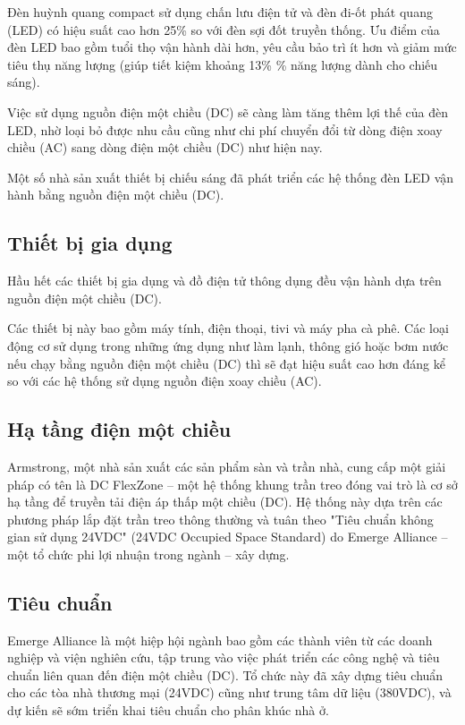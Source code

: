 \documentclass{thesis}
\begin{document}
Đèn huỳnh quang compact sử dụng chấn lưu điện tử và đèn đi-ốt phát
quang (LED) có hiệu suất cao hơn 25\% so với đèn sợi đốt truyền thống.
Ưu điểm của đèn LED bao gồm tuổi thọ vận hành dài hơn, yêu cầu bảo
trì ít hơn và giảm mức tiêu thụ năng lượng (giúp tiết kiệm khoảng 13\%
\% năng lượng dành cho chiếu sáng).

Việc sử dụng nguồn điện một chiều (DC) sẽ càng làm tăng thêm lợi
thế của đèn LED, nhờ loại bỏ được nhu cầu cũng như chi phí chuyển
đổi từ dòng điện xoay chiều (AC) sang dòng điện một chiều (DC) như hiện nay.

Một số nhà sản xuất thiết bị chiếu sáng đã phát triển các hệ thống
đèn LED vận hành bằng nguồn điện một chiều (DC).

\subsection{Thiết bị gia dụng}

Hầu hết các thiết bị gia dụng và đồ điện tử thông dụng đều vận hành
dựa trên nguồn điện một chiều (DC).

Các thiết bị này bao gồm máy tính, điện thoại, tivi và máy pha cà
phê. Các loại động cơ sử dụng trong những ứng dụng như làm lạnh,
thông gió hoặc bơm nước nếu chạy bằng nguồn điện một chiều (DC) thì
sẽ đạt hiệu suất cao hơn đáng kể so với các hệ thống sử dụng nguồn
điện xoay chiều (AC).

\subsection{Hạ tầng điện một chiều}

Armstrong, một nhà sản xuất các sản phẩm sàn và trần nhà, cung cấp
một giải pháp có tên là DC FlexZone – một hệ thống khung trần treo
đóng vai trò là cơ sở hạ tầng để truyền tải điện áp thấp một chiều
(DC). Hệ thống này dựa trên các phương pháp lắp đặt trần treo thông
thường và tuân theo "Tiêu chuẩn không gian sử dụng 24VDC" (24VDC
Occupied Space Standard) do Emerge Alliance – một tổ chức phi lợi
nhuận trong ngành – xây dựng.

\subsection{Tiêu chuẩn}

Emerge Alliance là một hiệp hội ngành bao gồm các thành viên từ các
doanh nghiệp và viện nghiên cứu, tập trung vào việc phát triển các
công nghệ và tiêu chuẩn liên quan đến điện một chiều (DC). Tổ chức
này đã xây dựng tiêu chuẩn cho các tòa nhà thương mại (24VDC) cũng
như trung tâm dữ liệu (380VDC), và dự kiến sẽ sớm triển khai tiêu
chuẩn cho phân khúc nhà ở.
\end{document}
